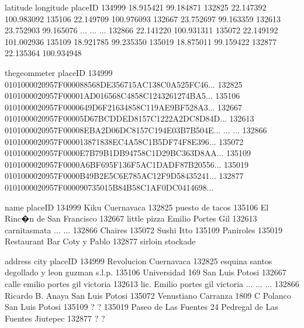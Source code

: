 \documentclass[letterpaper,10pt,english]{jupyterBook}
\begin{document}
\begin{sphinxVerbatim}[commandchars=\\\{\}]
          latitude   longitude  \PYGZbs{}
placeID                          
134999   18.915421  \PYGZhy{}99.184871   
132825   22.147392 \PYGZhy{}100.983092   
135106   22.149709 \PYGZhy{}100.976093   
132667   23.752697  \PYGZhy{}99.163359   
132613   23.752903  \PYGZhy{}99.165076   
...            ...         ...   
132866   22.141220 \PYGZhy{}100.931311   
135072   22.149192 \PYGZhy{}101.002936   
135109   18.921785  \PYGZhy{}99.235350   
135019   18.875011  \PYGZhy{}99.159422   
132877   22.135364 \PYGZhy{}100.934948   

                                            the\PYGZus{}geom\PYGZus{}meter  \PYGZbs{}
placeID                                                      
134999   0101000020957F000088568DE356715AC138C0A525FC46...   
132825   0101000020957F00001AD016568C4858C1243261274BA5...   
135106   0101000020957F0000649D6F21634858C119AE9BF528A3...   
132667   0101000020957F00005D67BCDDED8157C1222A2DC8D84D...   
132613   0101000020957F00008EBA2D06DC8157C194E03B7B504E...   
...                                                    ...   
132866   0101000020957F000013871838EC4A58C1B5DF74F8E396...   
135072   0101000020957F0000E7B79B1DB94758C1D29BC363D8AA...   
135109   0101000020957F0000A6BF695F136F5AC1DADF87B20556...   
135019   0101000020957F0000B49B2E5C6E785AC12F9D58435241...   
132877   0101000020957F000090735015B84B58C1AF0DC0414698...   

                                   name  \PYGZbs{}
placeID                                   
134999                  Kiku Cuernavaca   
132825                  puesto de tacos   
135106       El Rinc�n de San Francisco   
132667   little pizza Emilio Portes Gil   
132613                    carnitas\PYGZus{}mata   
...                                 ...   
132866                          Chaires   
135072                       Sushi Itto   
135109                        Paniroles   
135019      Restaurant Bar Coty y Pablo   
132877                 sirloin stockade   

                                                 address             city  \PYGZbs{}
placeID                                                                     
134999                                        Revolucion       Cuernavaca   
132825            esquina santos degollado y leon guzman           s.l.p.   
135106                                   Universidad 169  San Luis Potosi   
132667                           calle emilio portes gil        victoria    
132613                            lic. Emilio portes gil         victoria   
...                                                  ...              ...   
132866                                  Ricardo B. Anaya  San Luis Potosi   
135072                Venustiano Carranza 1809 C Polanco  San Luis Potosi   
135109                                                 ?                ?   
135019   Paseo de Las Fuentes 24 Pedregal de Las Fuentes         Jiutepec   
132877                                                 ?                ?   


\end{sphinxVerbatim}
\end{document}
